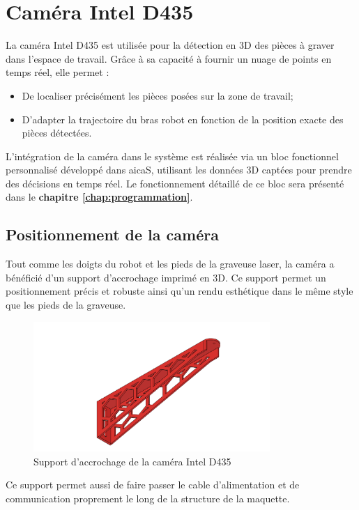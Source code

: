 \section{Caméra Intel D435}

La caméra Intel D435 \cite{IntelD435} est utilisée pour la détection en 3D des pièces à graver dans l’espace de travail. Grâce à sa capacité à fournir un nuage de points en temps réel, elle permet :
\begin{itemize}
    \item De localiser précisément les pièces posées sur la zone de travail;
    \item D’adapter la trajectoire du bras robot en fonction de la position exacte des pièces détectées.
\end{itemize}

L’intégration de la caméra dans le système est réalisée via un bloc fonctionnel personnalisé développé dans \gls{aicaS}, utilisant les données 3D captées pour prendre des décisions en temps réel. Le fonctionnement détaillé de ce bloc sera présenté dans le \textbf{chapitre \ref{chap:programmation}}.

\subsection{Positionnement de la caméra}
Tout comme les doigts du robot et les pieds de la graveuse laser, la caméra a bénéficié d'un support d'accrochage imprimé en 3D. Ce support permet un positionnement précis et robuste ainsi qu'un rendu esthétique dans le même style que les pieds de la graveuse.

\begin{figure}[H]
    \centering
    \includegraphics[width=0.8\textwidth]{assets/figures/Porte_camera v6.png}
    \caption{Support d'accrochage de la caméra Intel D435}
    \label{fig:support_camera}
\end{figure}

Ce support permet aussi de faire passer le cable d'alimentation et de communication proprement le long de la structure de la maquette.


